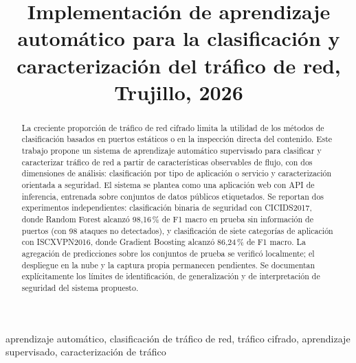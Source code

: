 \documentclass[conference]{IEEEtran}
\begin{document}
\title{Implementación de aprendizaje automático para la clasificación y caracterización del tráfico de red, Trujillo, 2026}

\author{
\and
{}
}

\maketitle

\renewcommand{\abstractname}{Resumen}
\begin{abstract}
La creciente proporción de tráfico de red cifrado limita la utilidad de los métodos de clasificación basados en puertos estáticos o en la inspección directa del contenido. Este trabajo propone un sistema de aprendizaje automático supervisado para clasificar y caracterizar tráfico de red a partir de características observables de flujo, con dos dimensiones de análisis: clasificación por tipo de aplicación o servicio y caracterización orientada a seguridad. El sistema se plantea como una aplicación web con API de inferencia, entrenada sobre conjuntos de datos públicos etiquetados. Se reportan dos experimentos independientes: clasificación binaria de seguridad con CICIDS2017, donde Random Forest alcanzó 98,16\,\% de F1 macro en prueba sin información de puertos (con 98 ataques no detectados), y clasificación de siete categorías de aplicación con ISCXVPN2016, donde Gradient Boosting alcanzó 86,24\,\% de F1 macro. La agregación de predicciones sobre los conjuntos de prueba se verificó localmente; el despliegue en la nube y la captura propia permanecen pendientes. Se documentan explícitamente los límites de identificación, de generalización y de interpretación de seguridad del sistema propuesto.
\end{abstract}

\renewcommand{\IEEEkeywordsname}{Palabras clave}
\begin{IEEEkeywords}
aprendizaje automático, clasificación de tráfico de red, tráfico cifrado, aprendizaje supervisado, caracterización de tráfico
\end{IEEEkeywords}
\end{document}
